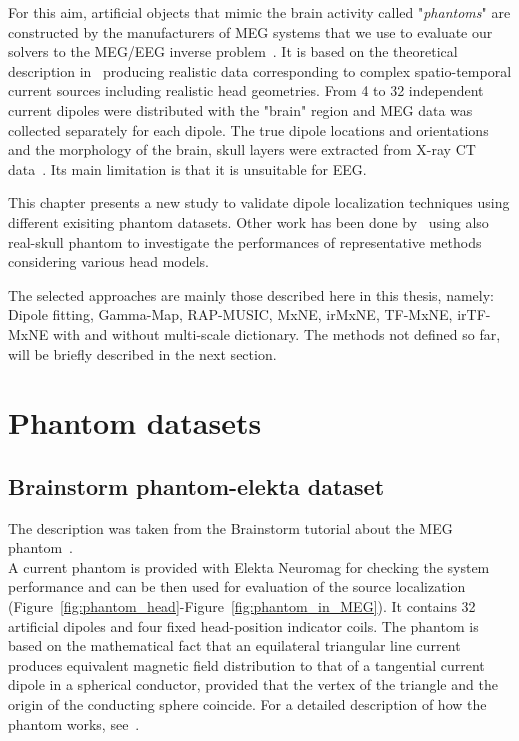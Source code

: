 For this aim, artificial objects that mimic the brain activity called "\textit{phantoms}" are constructed by the manufacturers of MEG systems that we use to evaluate our solvers to the MEG/EEG inverse problem~\cite{hazim2015magnetoencephalography}. It is based on the theoretical description in~\cite{ilmoniemi1985forward} producing realistic data corresponding to complex spatio-temporal current sources including realistic head geometries. From 4 to 32 independent current dipoles were distributed with the "brain" region and MEG data was collected separately for each dipole. The true dipole locations and orientations and the morphology of the brain, skull layers were extracted from X-ray CT data~\cite{leahy1998study}. Its main limitation is that it is unsuitable for EEG.

This chapter presents a new study to validate dipole localization techniques using different exisiting phantom datasets. Other work has been done by~\cite{hazim2015magnetoencephalography,leahy1998study,baillet2001evaluation} using also real-skull phantom to investigate the performances of representative methods considering various head models.

The selected approaches are mainly those described here in this thesis, namely: Dipole fitting, Gamma-Map, RAP-MUSIC, MxNE, irMxNE, TF-MxNE, irTF-MxNE with and without multi-scale dictionary. The methods not defined so far, will be briefly described in the next section.

\section{Phantom datasets}
\subsection{Brainstorm phantom-elekta dataset}
The description was taken from the Brainstorm tutorial about the MEG phantom~\cite{tadel2011brainstorm}.\\

A current phantom is provided with Elekta Neuromag for checking the system performance and can be then used for evaluation of the source localization (Figure~\ref{fig:phantom_head}-Figure~\ref{fig:phantom_in_MEG}). It contains 32 artificial dipoles and four fixed head-position indicator coils. The phantom is based on the mathematical fact that an equilateral triangular line current produces equivalent magnetic field distribution to that of a tangential current dipole in a spherical conductor, provided that the vertex of the triangle and the origin of the conducting sphere coincide. For a detailed description of how the phantom works, see~\cite{ilmoniemi1985forward}.\\
\\

